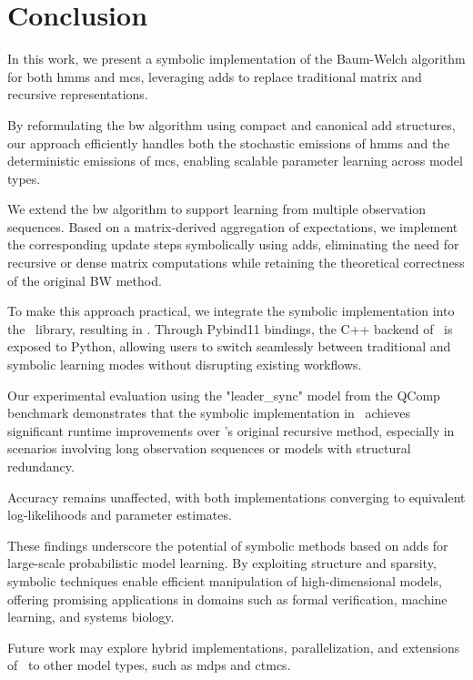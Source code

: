 \section{Conclusion}\label{sec:conclusion}
In this work, we present a symbolic implementation of the Baum-Welch algorithm for both \glspl{hmm} and \glspl{mc}, leveraging \glspl{add} to replace traditional matrix and recursive representations.

By reformulating the \gls{bw} algorithm using compact and canonical \gls{add} structures, our approach efficiently handles both the stochastic emissions of \glspl{hmm} and the deterministic emissions of \glspl{mc}, enabling scalable parameter learning across model types.

We extend the \gls{bw} algorithm to support learning from multiple observation sequences.
Based on a matrix-derived aggregation of expectations, we implement the corresponding update steps symbolically using \glspl{add}, eliminating the need for recursive or dense matrix computations while retaining the theoretical correctness of the original BW method.

To make this approach practical, we integrate the symbolic implementation into the \Jajapy\ library, resulting in \JajapyTwo. Through Pybind11 bindings, the C++ backend of \Cupaal\ is exposed to Python, allowing users to switch seamlessly between traditional and symbolic learning modes without disrupting existing workflows.

Our experimental evaluation using the "leader\_sync" model from the QComp benchmark demonstrates that the symbolic implementation in \Cupaal\ achieves significant runtime improvements over \Jajapy's original recursive method, especially in scenarios involving long observation sequences or models with structural redundancy.

Accuracy remains unaffected, with both implementations converging to equivalent log-likelihoods and parameter estimates.

These findings underscore the potential of symbolic methods based on \glspl{add} for large-scale probabilistic model learning.
By exploiting structure and sparsity, symbolic techniques enable efficient manipulation of high-dimensional models, offering promising applications in domains such as formal verification, machine learning, and systems biology.

Future work may explore hybrid implementations, parallelization, and extensions of \Cupaal\ to other model types, such as \glspl{mdp} and \glspl{ctmc}.
